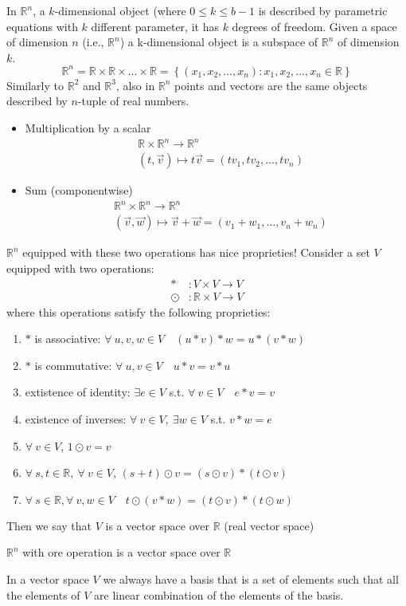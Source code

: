 In $\mathbb{R}^n$, a $k$-dimensional object (where $0 \le k \le b-1$ is described by parametric equations with $k$ different parameter, it has $k$ degrees of freedom. Given a space of dimension $n$ (i.e., $\mathbb{R}^n$) a k-dimensional object is a subspace of $\mathbb{R}^n$ of dimension $k$. 
$$\mathbb{R}^n = \mathbb{R} \times \mathbb{R} \times \dots \times \mathbb{R}= \left\{ (x_1, x_2, \dots, x_n): x_1, x_2, \dots, x_n \in \mathbb{R} \right\} $$
Similarly to $\mathbb{R}^2$ and $\mathbb{R}^3$, also in $\mathbb{R}^n$ points and vectors are the same objects described by $n$-tuple of real numbers.
\begin{itemize}
    \item Multiplication by a scalar
    \begin{align*}
        &\mathbb{R} \times \mathbb{R}^n \longrightarrow \mathbb{R}^n\\
        &(t, \vec v) \longmapsto t \vec v = (tv_1, tv_2, \dots, tv_n)
    \end{align*}
    \item Sum (componentwise)
    \begin{align*}
        &\mathbb{R}^n \times\mathbb{R}^n \longrightarrow \mathbb{R}^n \\
        &(\vec v, \vec w) \longmapsto \vec v + \vec w = (v_1+w_1, \dots, v_n+w_n)
    \end{align*}
\end{itemize}
$\mathbb{R}^n$ equipped with these two operations has nice proprieties! Consider a set $V$ equipped with two operations:
\begin{align*}
    *&: V \times V \longrightarrow V\\
    \odot &: \mathbb{R} \times V \longrightarrow V
\end{align*}
where this operations satisfy the following proprieties:
\begin{enumerate}
    \item $*$ is associative: $\forall \ u,v,w \in V \quad (u*v)*w = u*(v*w)$
    \item $*$ is commutative: $\forall \ u,v \in V \quad u*v = v*u$
    \item extistence of identity: $\exists e \in V$ s.t. $\forall \ v \in V \quad e*v=v$
    \item existence of inverses: $\forall \ v \in V,\ \exists w \in V$ s.t. $v*w = e$
    \item $\forall \ v \in V$, $1\odot v = v$
    \item $\forall \ s,t \in \mathbb{R}, \ \forall \ v \in V$, \quad $(s+t) \odot v = (s \odot v) * (t \odot v)$
    \item $\forall \ s \in \mathbb{R}, \forall \ v,w \in V \quad t \odot (v*w)=(t\odot v) * (t \odot w)$
\end{enumerate}
Then we say that $V$ is a vector space over $\mathbb{R}$ (real vector space)
\begin{remark}[Remark]
    $\mathbb{R}^n$ with ore operation is a vector space over $\mathbb{R}$
\end{remark}
In a vector space $V$ we always have a basis that is a set of elements such that all the elements of $V$ are linear combination of the elements of the basis.

